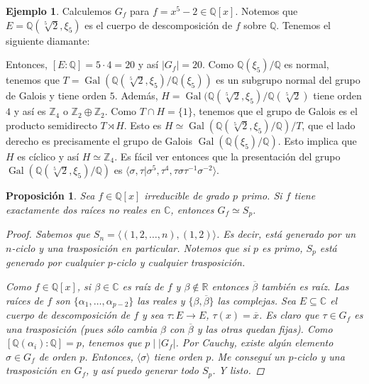 \documentclass[12pt]{book}
\newtheorem{prop}[teo]{Proposición}
\theoremstyle{definition}
\newtheorem{ex}[teo]{Ejemplo}
\newcommand{\CC}{\mathbb{C}}
\newcommand{\RR}{\mathbb{R}}      %
\newcommand{\ZZ}{\mathbb{Z}}      %
\newcommand{\QQ}{\mathbb{Q}}
\DeclareMathOperator{\Gal}{Gal}
\begin{document}
\begin{ex}
Calculemos $G_f$ para $f=x^5 - 2\in\QQ[x]$. Notemos que $E=\QQ(\sqrt[5]{2},\xi_5)$ es el cuerpo de descomposición de $f$ sobre $\QQ$. Tenemos el siguiente diamante: 
\begin{center}
\end{center}
Entonces, $[E:\QQ]=5\cdot 4 = 20$ y así $|G_f|=20$. Como $\QQ(\xi_5)/\QQ$ es normal, tenemos que $T=\Gal(\QQ(\sqrt[5]{2},\xi_5)/\QQ(\xi_5))$ es un subgrupo normal del grupo de Galois y tiene orden $5$. Además, $H=\Gal(\QQ(\sqrt[5]{2},\xi_5)/\QQ(\sqrt[5]{2})$ tiene orden $4$ y así es $\ZZ_4$ o $\ZZ_2\oplus\ZZ_2$. Como $T\cap H = \{1\}$, tenemos que el grupo de Galois es el producto semidirecto $T\rtimes H$. Esto es $H\simeq \Gal(\QQ(\sqrt[5]{2},\xi_5)/\QQ)/T$, que el lado derecho es precisamente el grupo de Galois $\Gal(\QQ(\xi_5)/\QQ)$. Esto implica que $H$ es cíclico y así $H\simeq \ZZ_4$. Es fácil ver entonces que la presentación del grupo $\Gal(\QQ(\sqrt[5]{2},\xi_5)/\QQ)$ es $\langle \sigma,\tau | \sigma^5, \tau^4, \tau\sigma\tau^{-1}\sigma^{-2} \rangle$.
\end{ex}

\begin{prop}
Sea $f\in\QQ[x]$ irreducible de grado $p$ primo. Si $f$ tiene exactamente dos raíces no reales en $\CC$, entonces $G_f\simeq S_p$.
\begin{proof}
Sabemos que $S_n = \langle (1,2,\ldots , n),(1,2)\rangle$. Es decir, está generado por un $n$-ciclo y una trasposición en particular. Notemos que si $p$ es primo, $S_p$ está generado por cualquier $p$-ciclo y cualquier trasposición. 

Como $f\in\QQ[x]$, si $\beta\in\CC$ es raíz de $f$ y $\beta\notin\RR$ entonces $\overline{\beta}$ también es raíz. Las raíces de $f$ son $\{\alpha_1,\ldots ,\alpha_{p-2}\}$ las reales y $\{\beta,\overline{\beta}\}$ las complejas. Sea $E\subseteq\CC$ el cuerpo de descomposición de $f$ y sea $\tau:E\to E$, $\tau(x)=\overline{x}$. Es claro que $\tau\in G_f$ es una trasposición (pues sólo cambia $\beta$ con $\overline{\beta}$ y las otras quedan fijas). Como $[\QQ(\alpha_i):\QQ]=p$, tenemos que $p\mid |G_f|$. Por Cauchy, existe algún elemento $\sigma\in G_f$ de orden $p$. Entonces, $\langle \sigma\rangle$ tiene orden $p$. Me conseguí un $p$-ciclo y una trasposición en $G_f$, y así puedo generar todo $S_p$. Y listo.
\end{proof}
\end{prop}
\end{document}
